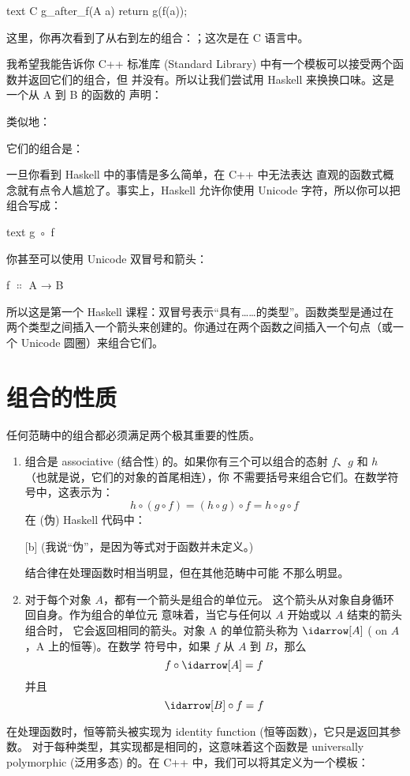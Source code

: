 \begin{snip}{text}
C g_after_f(A a)
{
    return g(f(a));
}
\end{snip}
这里，你再次看到了从右到左的组合：；这次是在 C 语言中。

我希望我能告诉你 C++ 标准库 (Standard Library) 中有一个模板可以接受两个函数并返回它们的组合，但
并没有。所以让我们尝试用 Haskell 来换换口味。这是一个从 A 到 B 的函数的
声明：

类似地：

它们的组合是：

一旦你看到 Haskell 中的事情是多么简单，在 C++ 中无法表达
直观的函数式概念就有点令人尴尬了。事实上，Haskell 允许你使用 Unicode 字符，所以你可以把
组合写成：
\begin{snip}{text}
g ◦ f
\end{snip}

你甚至可以使用 Unicode 双冒号和箭头：
\begin{snipv}
f \ensuremath{\Colon} A → B
\end{snipv}
所以这是第一个 Haskell 课程：双冒号表示“具有……的类型”。函数类型是通过在
两个类型之间插入一个箭头来创建的。你通过在两个函数之间插入一个句点（或一个 Unicode 圆圈）来组合它们。

\section{组合的性质}

任何范畴中的组合都必须满足两个极其重要的性质。

\begin{enumerate}
  \item
        组合是 associative (结合性) 的。如果你有三个可以组合的态射 $f$、$g$ 和 $h$
        （也就是说，它们的对象的首尾相连），你
        不需要括号来组合它们。在数学符号中，这表示为：
        \[h \circ (g \circ f) = (h \circ g) \circ f = h \circ g \circ f\]
        在 (伪) Haskell 代码中：

        [b]
        (我说“伪”，是因为等式对于函数并未定义。)

        结合律在处理函数时相当明显，但在其他范畴中可能
        不那么明显。

  \item
        对于每个对象 $A$，都有一个箭头是组合的单位元。
        这个箭头从对象自身循环回自身。作为组合的单位元
        意味着，当它与任何以 $A$ 开始或以 $A$ 结束的箭头组合时，
        它会返回相同的箭头。对象 A 的单位箭头称为 $\idarrow[A]$ ( on $A$，A 上的恒等)。在数学
        符号中，如果 $f$ 从 $A$ 到 $B$，那么
        \[f \circ \idarrow[A] = f\]
        并且
        \[\idarrow[B] \circ f = f\]
\end{enumerate}
在处理函数时，恒等箭头被实现为 identity function (恒等函数)，它只是返回其参数。
对于每种类型，其实现都是相同的，这意味着这个函数是
universally polymorphic (泛用多态) 的。在 C++ 中，我们可以将其定义为一个模板：

